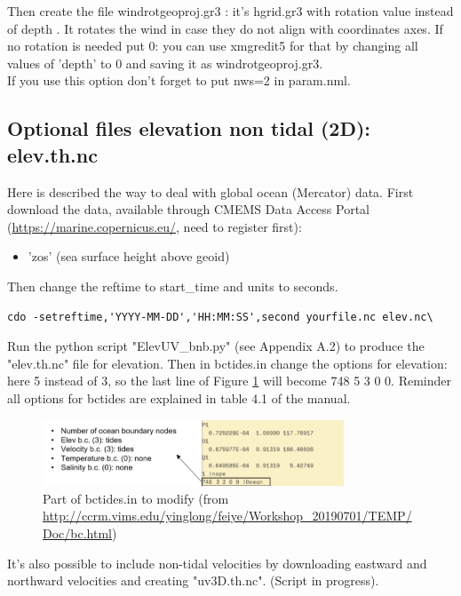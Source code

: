 \documentclass[preprints,briefreport,accept,oneauthor,pdftex]{Definitions/mdpi}
\begin{document}
Then create the file windrotgeoproj.gr3 : it's hgrid.gr3 with rotation value instead of depth . It rotates the wind in case they do not align with coordinates axes. If no rotation is needed put 0: you can use xmgredit5 for that by changing all values of 'depth' to 0 and saving it as windrotgeoproj.gr3.\\
If you use this option don't forget to put nws=2 in param.nml.

\subsection{Optional files elevation non tidal (2D): elev.th.nc}
\noindent Here is described the way to deal with global ocean (Mercator) data. First download the data, available through CMEMS Data Access Portal (\url{https://marine.copernicus.eu/}, need to register first):
\begin{itemize}
    \item 'zos' (sea surface height above geoid)
\end{itemize}
Then change the reftime  to start\_time and units to seconds.
\begin{lstlisting}
cdo -setreftime,'YYYY-MM-DD','HH:MM:SS',second yourfile.nc elev.nc\
\end{lstlisting}
Run the python script "ElevUV\_bnb.py" (see Appendix A.2) to produce the "elev.th.nc" file for elevation. Then in bctides.in change the options for elevation: here 5 instead of 3, so the last line of Figure \ref{fig:caseBC} will become 748 5 3 0 0. Reminder all options for bctides are explained in table 4.1 of the manual.\\
\begin{figure}[htbp]
    \centering
    \includegraphics[width=0.8\textwidth]{figures/elevbc.png}
    \caption{Part of bctides.in to modify (from \url{http://ccrm.vims.edu/yinglong/feiye/Workshop_20190701/TEMP/Doc/bc.html})}
    \label{fig:caseBC}
\end{figure}
It's also possible to include non-tidal velocities by downloading eastward and northward velocities and creating "uv3D.th.nc". (Script in progress).
\end{document}
